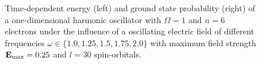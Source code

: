 \begin{figure}[!h]
    \centering
    \caption{Time-dependent energy (left) and ground state probability (right)
        of a one-dimensional harmonic oscillator with $\Omega=1$
        and $n=6$ electrons under the influence of a oscillating electric field 
        of different frequencies $\omega\in\{1.0, 1.25, 1.5, 1.75, 2.0\}$ with 
        maximum field strength $\vb{E}_\text{max}=0.25$ and $l=30$ 
        spin-orbitals.
    }
    \label{fig:1d_n6_qd_resonance}
\end{figure}

